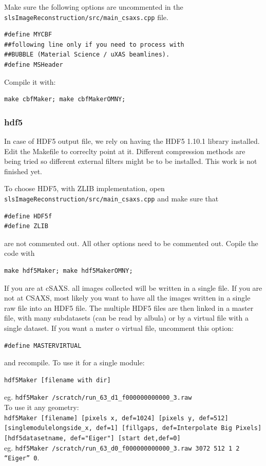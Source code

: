 \documentclass{article}
\begin{document}
Make sure the following options are uncommented in the {\tt{slsImageReconstruction/src/main\_csaxs.cpp}} file. 
\begin{verbatim}
#define MYCBF
##following line only if you need to process with 
##BUBBLE (Material Science / uXAS beamlines).
#define MSHeader 
\end{verbatim}
Compile it with: 
\begin{verbatim}
make cbfMaker; make cbfMakerOMNY;
\end{verbatim}

\subsubsection{hdf5}
In case of HDF5 output file, we rely on having the HDF5 1.10.1 library installed. Edit the Makefile to correclty point at it. Different compression methods are being tried so different external filters might be to be installed. This work is not finished yet.

To choose HDF5, with ZLIB implementation, open {\tt{slsImageReconstruction/src/main\_csaxs.cpp}} and make sure that 
\begin{verbatim}
#define HDF5f
#define ZLIB
\end{verbatim}
are not commented out. All other options need to be commented out. Copile the code with 
\begin{verbatim}
make hdf5Maker; make hdf5MakerOMNY;
\end{verbatim}

If you are at cSAXS. all images collected will be written in a single file. If you are not at CSAXS, most likely you want to have all the images written in a single raw file into an HDF5 file. The multiple HDF5 files are then linked in a master file, with many subdatasets (can be read by albula) or by a virtual file with a single dataset. If you want a mster o virtual file, uncomment this option:
\begin{verbatim}
#define MASTERVIRTUAL
\end{verbatim}
and recompile.
To use it for a single module:
\begin{verbatim}
hdf5Maker [filename with dir]
\end{verbatim}
eg.
{\tt{hdf5Maker /scratch/run\_63\_d1\_f000000000000\_3.raw}}\\

To use it any geometry:\\
{\tt{hdf5Maker [filename] [pixels x, def=1024] [pixels y, def=512] [singlemodulelongside\_x, def=1] [fillgaps, def=Interpolate Big Pixels] [hdf5datasetname, def="Eiger"] [start det,def=0]}}\\
eg.
{\tt hdf5Maker /scratch/run\_63\_d0\_f000000000000\_3.raw  3072 512 1 2 ``Eiger'' 0}.\\
\end{document}
